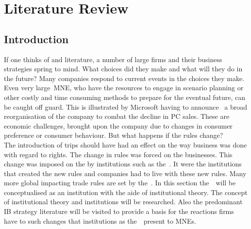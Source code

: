 \chapter{Literature Review}\label{ch:LitReview}

\section{Introduction}

If one thinks of  and literature, a number of large firms and their business strategies spring to mind.
What choices did they make and what will they do in the future? 
Many companies respond to current events in the choices they make.
Even very large~\gls{MNE}, who have the resources to engage in scenario planning or other costly and time consuming methods to prepare for the eventual future, can be caught off guard.
This is illustrated by Microsoft having to announce~\citep{FT:2013} a broad reorganisation of the company to combat the decline in PC sales.  %
These are economic challenges, brought upon the company due to changes in consumer preference or consumer behaviour.
But what happens if the rules change? \\
The introduction of \gls{trips} should have had an effect on the way business was done with regard to  rights.
The change in rules was forced on the businesses. 
This change was imposed on the  by institutions such as the~\wto. 
It were the institutions that created the new rules and companies had to live with these new rules.
Many more global impacting trade rules are set by the~\wto. 
In this section the~\wto~will be conceptualised as an institution with the aide of institutional theory.
The concept of institutional theory and institutions will be researched.
Also the predominant IB strategy literature will be visited to provide a basis for the reactions firms have to such changes that institutions as the~\wto~present to MNEs. 












%